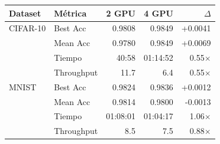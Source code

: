 \begin{tabular}{llrrr}
\toprule
Dataset & Métrica & 2 GPU & 4 GPU & $\Delta$ \\
\midrule
CIFAR-10 & Best Acc & 0.9808 & 0.9849 & +0.0041 \\
 & Mean Acc & 0.9780 & 0.9849 & +0.0069 \\
 & Tiempo & 40:58 & 01:14:52 & 0.55$\times$ \\
 & Throughput & 11.7 & 6.4 & 0.55$\times$ \\
\midrule
MNIST & Best Acc & 0.9824 & 0.9836 & +0.0012 \\
 & Mean Acc & 0.9814 & 0.9800 & -0.0013 \\
 & Tiempo & 01:08:01 & 01:04:17 & 1.06$\times$ \\
 & Throughput & 8.5 & 7.5 & 0.88$\times$ \\
\midrule
\bottomrule
\end{tabular}